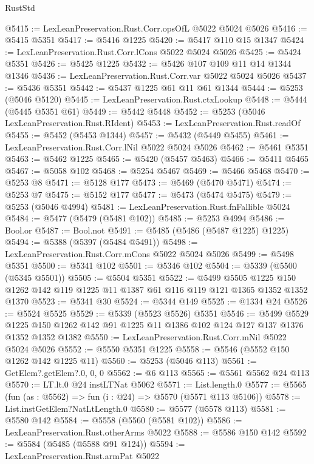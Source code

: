 \begin{lexlean}{RustStd}
\begin{coremodule}
@5415 := LexLeanPreservation.Rust.Corr.opsOfL @5022 @5024 @5026
@5416 := @5415 @5351
@5417 := @5416 @1225
@5420 := @5417 @110 @15 @1347
@5424 := LexLeanPreservation.Rust.Corr.lCons @5022 @5024 @5026
@5425 := @5424 @5351
@5426 := @5425 @1225
@5432 := @5426 @107 @109 @11 @14 @1344 @1346
@5436 := LexLeanPreservation.Rust.Corr.var @5022 @5024 @5026
@5437 := @5436 @5351
@5442 := @5437 @1225 @61 @11 @61 @1344
@5444 := @5253 (@5046 @5120)
@5445 := LexLeanPreservation.Rust.ctxLookup
@5448 := @5444 (@5445 @5351 @61)
@5449 := @5442 @5448
@5452 := @5253 (@5046 LexLeanPreservation.Rust.RIdent)
@5453 := LexLeanPreservation.Rust.readOf
@5455 := @5452 (@5453 @1344)
@5457 := @5432 (@5449 @5455)
@5461 := LexLeanPreservation.Rust.Corr.lNil @5022 @5024 @5026
@5462 := @5461 @5351
@5463 := @5462 @1225
@5465 := @5420 (@5457 @5463)
@5466 := @5411 @5465
@5467 := @5058 @102
@5468 := @5254 @5467
@5469 := @5466 @5468
@5470 := @5253 @8
@5471 := @5128 @177
@5473 := @5469 (@5470 @5471)
@5474 := @5253 @7
@5475 := @5152 @177
@5477 := @5473 (@5474 @5475)
@5479 := @5253 (@5046 @4994)
@5481 := LexLeanPreservation.Rust.fnFallible @5024
@5484 := @5477 (@5479 (@5481 @102))
@5485 := @5253 @4994
@5486 := Bool.or
@5487 := Bool.not
@5491 := @5485 (@5486 (@5487 @1225) @1225)
@5494 := @5388 (@5397 (@5484 @5491))
@5498 := LexLeanPreservation.Rust.Corr.mCons @5022 @5024 @5026
@5499 := @5498 @5351
@5500 := @5341 @102
@5501 := @5346 @102
@5504 := @5339 (@5500 (@5345 @5501))
@5505 := @5504 @5351
@5522 := @5499
    @5505
    @1225
    @150
    @1262
    @142
    @119
    @1225
    @11
    @1387
    @61
    @116
    @119
    @121
    @1365
    @1352
    @1352
    @1370
@5523 := @5341 @30
@5524 := @5344 @149
@5525 := @1334 @24
@5526 := @5524 @5525
@5529 := @5339 (@5523 @5526) @5351
@5546 := @5499
    @5529
    @1225
    @150
    @1262
    @142
    @91
    @1225
    @11
    @1386
    @102
    @124
    @127
    @137
    @1376
    @1352
    @1352
    @1382
@5550 := LexLeanPreservation.Rust.Corr.mNil @5022 @5024 @5026
@5552 := @5550 @5351 @1225
@5558 := @5546 (@5552 @150 @1262 @142 @1225 @11)
@5560 := @5253 (@5046 @113)
@5561 := GetElem?.getElem?.{0, 0, 0}
@5562 := @6 @113
@5565 := @5561 @5562 @24 @113
@5570 := LT.lt.{0} @24 instLTNat @5062
@5571 := List.length.{0}
@5577 := @5565 (fun (as : @5562) => fun (i : @24) => @5570 (@5571 @113 @5106))
@5578 := List.instGetElem?NatLtLength.{0}
@5580 := @5577 (@5578 @113)
@5581 := @5580 @142
@5584 := @5558 (@5560 (@5581 @102))
@5586 := LexLeanPreservation.Rust.otherArms @5022
@5588 := @5586 @150 @142
@5592 := @5584 (@5485 (@5588 @91 @124))
@5594 := LexLeanPreservation.Rust.armPat @5022

\end{coremodule}
\end{lexlean}
